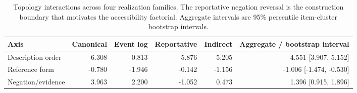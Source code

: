 \begin{table}[H]
\centering
\footnotesize
\setlength{\tabcolsep}{4pt}
\begin{tabularx}{\textwidth}{Xrrrrr}
\toprule
Axis & Canonical & Event log & Reportative & Indirect & Aggregate / bootstrap interval \\
\midrule
Description order & 6.308 & 0.813 & 5.876 & 5.205 & 4.551 [3.907, 5.152] \\
Reference form & -0.780 & -1.946 & -0.142 & -1.156 & -1.006 [-1.474, -0.530] \\
Negation/evidence & 3.963 & 2.200 & -1.052 & 0.473 & 1.396 [0.915, 1.896] \\
\bottomrule
\end{tabularx}
\caption{Topology interactions across four realization families. The reportative negation reversal is the construction boundary that motivates the accessibility factorial. Aggregate intervals are 95\% percentile item-cluster bootstrap intervals.}
\label{tab:multitemplate}
\end{table}
